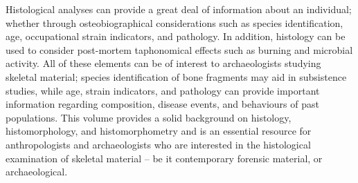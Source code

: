 \documentclass[%
	]{ijsra}
\begin{document}
Histological analyses can provide a great deal of information about an individual; whether through osteobiographical considerations such as species identification, age, occupational strain indicators, and pathology. In addition, histology can be used to consider post-mortem taphonomical effects such as burning and microbial activity. All of these elements can be of interest to archaeologists studying skeletal material; species identification of bone fragments may aid in subsistence studies, while age, strain indicators, and pathology can provide important information regarding composition, disease events, and behaviours of past populations. This volume provides a solid background on histology, histomorphology, and histomorphometry and is an essential resource for anthropologists and archaeologists who are interested in the histological examination of skeletal material – be it contemporary forensic material, or archaeological. 

\IJSRAclosing%
\end{document}

